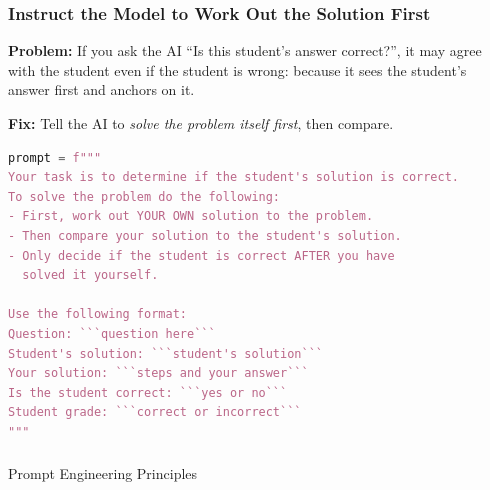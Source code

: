 \begin{frame}[fragile]\frametitle{Instruct the Model to Work Out the Solution First}

\textbf{Problem:} If you ask the AI ``Is this student's answer correct?'', it may agree with the student even if the student is wrong: because it sees the student's answer first and anchors on it.

\medskip
\textbf{Fix:} Tell the AI to \emph{solve the problem itself first}, then compare.

{\tiny
\begin{lstlisting}[language=Python]
prompt = f"""
Your task is to determine if the student's solution is correct.
To solve the problem do the following:
- First, work out YOUR OWN solution to the problem. 
- Then compare your solution to the student's solution.
- Only decide if the student is correct AFTER you have 
  solved it yourself.

Use the following format:
Question: ```question here```
Student's solution: ```student's solution```
Your solution: ```steps and your answer```
Is the student correct: ```yes or no```
Student grade: ```correct or incorrect```
"""
\end{lstlisting}
}

\end{frame}


\begin{frame}[fragile]\frametitle{}
\begin{center}
{\Large Prompt Engineering Principles}
\end{center}
\end{frame}


